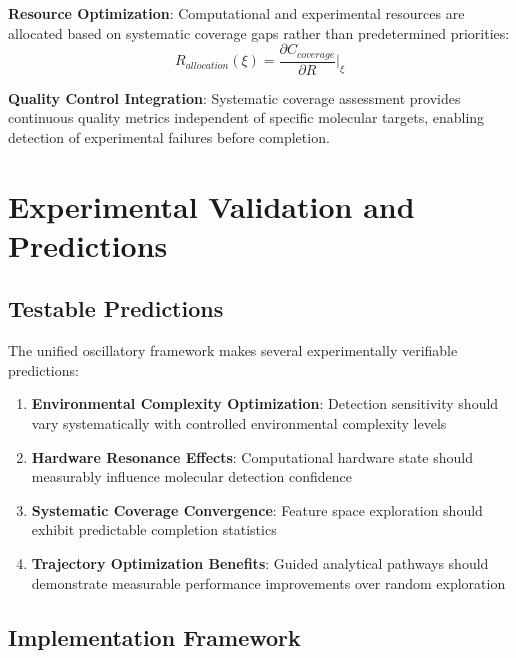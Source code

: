 \documentclass[11pt,a4paper]{article}
\begin{document}
\textbf{Resource Optimization}: Computational and experimental resources are allocated based on systematic coverage gaps rather than predetermined priorities:
\begin{equation}
R_{allocation}(\xi) = \frac{\partial C_{coverage}}{\partial R} \bigg|_{\xi}
\end{equation}

\textbf{Quality Control Integration}: Systematic coverage assessment provides continuous quality metrics independent of specific molecular targets, enabling detection of experimental failures before completion.

\section{Experimental Validation and Predictions}

\subsection{Testable Predictions}

The unified oscillatory framework makes several experimentally verifiable predictions:

\begin{enumerate}
\item \textbf{Environmental Complexity Optimization}: Detection sensitivity should vary systematically with controlled environmental complexity levels
\item \textbf{Hardware Resonance Effects}: Computational hardware state should measurably influence molecular detection confidence
\item \textbf{Systematic Coverage Convergence}: Feature space exploration should exhibit predictable completion statistics
\item \textbf{Trajectory Optimization Benefits}: Guided analytical pathways should demonstrate measurable performance improvements over random exploration
\end{enumerate}

\subsection{Implementation Framework}
\end{document}
